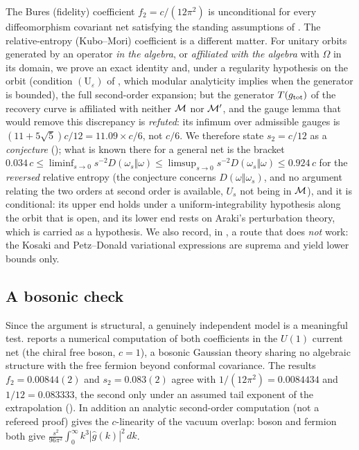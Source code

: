 The Bures (fidelity) coefficient $f_2=c/(12\pi^2)$ is unconditional for every
diffeomorphism covariant net satisfying the standing assumptions of .
The relative-entropy (Kubo--Mori) coefficient is a different matter.  For unitary orbits
generated by an operator \emph{in the algebra}, or \emph{affiliated with the algebra} with $\Omega$ in its domain, we prove an exact identity and,
under a regularity hypothesis on the orbit (condition $(\mathrm U_{\varepsilon})$ of , which modular analyticity implies when the generator is bounded), the full second-order expansion; but the generator
$T(g_{\rm tot})$ of the recovery curve is affiliated with neither $\mathcal M$ nor $\mathcal M'$, and the
gauge lemma that would remove this discrepancy is \emph{refuted}: its infimum over admissible gauges is
$(11+5\sqrt5)c/12=11.09\times c/6$, not $c/6$.  We therefore state $s_2=c/12$ as a \emph{conjecture}
(); what is known there for a general net is the bracket
$0.034\,c\le\liminf_{s\to0}s^{-2}D(\omega_{s}\Vert\omega)\le\limsup_{s\to0}s^{-2}D(\omega_{s}\Vert\omega)\le0.924\,c$ for the \emph{reversed} relative entropy (the conjecture concerns $D(\omega\Vert\omega_{s})$, and no argument relating the two orders at second order is available, $U_{s}$ not being in $\mathcal M$), and it is conditional: its upper end holds under a uniform-integrability hypothesis along the orbit that is open, and its lower end rests on Araki's perturbation theory, which is carried as a hypothesis.
We also record, in , a route that does \emph{not} work: the Kosaki and
Petz--Donald variational expressions are suprema and yield lower bounds only.

\subsection*{A bosonic check}

Since the argument is structural, a genuinely independent model is a meaningful test.
 reports a numerical computation of both coefficients in the $U(1)$ current
net (the chiral free boson, $c=1$), a bosonic Gaussian theory sharing no algebraic
structure with the free fermion beyond conformal covariance.  The results
$f_2=0.00844(2)$ and $s_2=0.083(2)$ agree with $1/(12\pi^2)=0.0084434$ and $1/12=0.083333$,
the second only under an assumed tail exponent of the extrapolation ().
In addition an analytic second-order computation (not a refereed proof) gives the
$c$-linearity of the vacuum overlap: boson and fermion both give $\frac{s^2}{96\pi^2}\int_0^\infty k^3|\hat g(k)|^2\,dk$.

